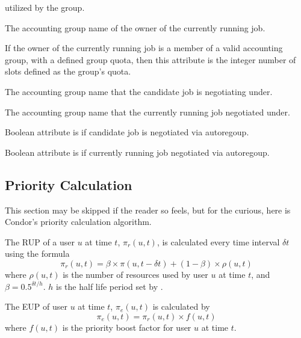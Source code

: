 \begin{description}
  utilized by the group.
\item[\index{ClassAd attribute, ephemeral!RemoteGroup}\AdAttr{RemoteGroup}:]
  The accounting group name of the owner of the currently running job.
\item[\index{ClassAd attribute, ephemeral!RemoteGroupQuota}\AdAttr{RemoteGroupQuota}:]
  If the owner of the currently running job is a member of a valid 
  accounting group, with a defined group quota,
  then this attribute is the integer number of slots defined as the
  group's quota.
\item[\index{ClassAd attribute, ephemeral!SubmitterNegotiatingGroup}\AdAttr{SubmitterNegotiatingGroup}:]
  The accounting group name that the candidate job is negotiating under.
\item[\index{ClassAd attribute, ephemeral!RemoteNegotiatingGroup}\AdAttr{RemoteNegotiatingGroup}:]
  The accounting group name that the currently running job negotiated under.
\item[\index{ClassAd attribute, ephemeral!SubmitterAutoregroup}\AdAttr{SubmitterAutoregroup}:]
  Boolean attribute is  if candidate job is negotiated via autoregoup.
\item[\index{ClassAd attribute, ephemeral!RemoteAutoregroup}\AdAttr{RemoteAutoregroup}:]
  Boolean attribute is  if currently running job negotiated via autoregoup.
\end{description}


\subsection{Priority Calculation}
This section may be skipped if the reader so feels, but for the curious,
here is Condor's priority calculation algorithm.

The RUP of a user $u$ at time $t$, $\pi_r(u,t)$, is calculated 
every time interval $\delta t$ using the formula 
$$\pi_r(u,t) = \beta\times\pi(u,t-\delta t) + (1-\beta)\times\rho(u,t)$$
where $\rho(u,t)$ is the number of resources used by user $u$ at time $t$,
and $\beta=0.5^{{\delta t}/h}$. $h$ is the half life period set by 
.

The EUP of user $u$ at time $t$, $\pi_e(u,t)$
is calculated by
$$\pi_e(u,t) = \pi_r(u,t)\times f(u,t)$$
where $f(u,t)$ is the priority boost factor for user $u$ at time $t$.

